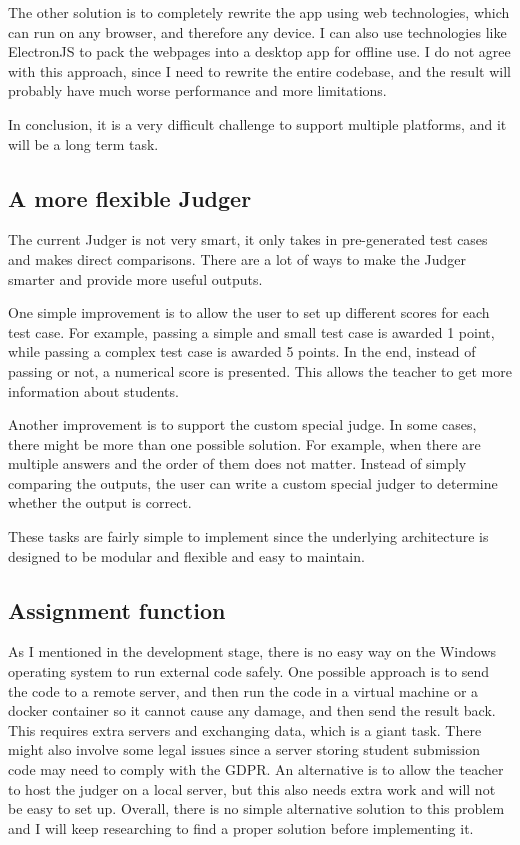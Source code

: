 \documentclass[report.tex]{subfiles}
\begin{document}
The other solution is to completely rewrite the app using web technologies, which can run on any browser, and therefore any device. I can also use technologies like ElectronJS\cite{electron} to pack the webpages into a desktop app for offline use. I do not agree with this approach, since I need to rewrite the entire codebase, and the result will probably have much worse performance and more limitations.

In conclusion, it is a very difficult challenge to support multiple platforms, and it will be a long term task.

\subsection{A more flexible Judger}

The current Judger is not very smart, it only takes in pre-generated test cases and makes direct comparisons. There are a lot of ways to make the Judger smarter and provide more useful outputs.

One simple improvement is to allow the user to set up different scores for each test case. For example, passing a simple and small test case is awarded 1 point, while passing a complex test case is awarded 5 points. In the end, instead of passing or not, a numerical score is presented. This allows the teacher to get more information about students.

Another improvement is to support the custom special judge. In some cases, there might be more than one possible solution. For example, when there are multiple answers and the order of them does not matter. Instead of simply comparing the outputs, the user can write a custom special judger to determine whether the output is correct.

These tasks are fairly simple to implement since the underlying architecture is designed to be modular and flexible and easy to maintain.

\subsection{Assignment function}

As I mentioned in the development stage, there is no easy way on the Windows operating system to run external code safely. One possible approach is to send the code to a remote server, and then run the code in a virtual machine or a docker container so it cannot cause any damage, and then send the result back. This requires extra servers and exchanging data, which is a giant task. There might also involve some legal issues since a server storing student submission code may need to comply with the GDPR. An alternative is to allow the teacher to host the judger on a local server, but this also needs extra work and will not be easy to set up. Overall, there is no simple alternative solution to this problem and I will keep researching to find a proper solution before implementing it.
\end{document}
